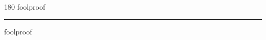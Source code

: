 
\begin{frame}
\begin{center}
\begin{turn}{180}
{\fontsize{2.5cm}{1em}\selectfont foolproof}
\end{turn}
\vspace{1em}\par  
\hrule
\vspace{1em}\par  
{\fontsize{2.5cm}{1em}\selectfont foolproof}
\end{center}
\end{frame}

